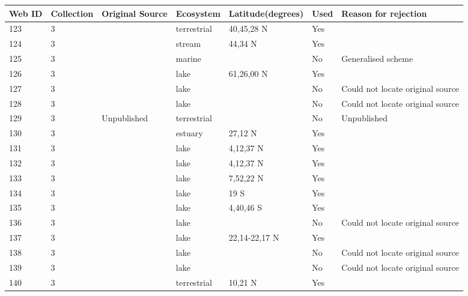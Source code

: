 \documentclass[12pt]{article}
\begin{document}
\begin{landscape}
    \begin{table}[h!]
    \centering
    {\footnotesize
      \begin{tabular}{p{2.8cm}p{1.3cm}p{3cm}p{2.2cm}p{2.5cm}lp{8.2cm}}
        \hline
        Web ID & Collection & Original Source & Ecosystem & Latitude(degrees) & Used  & Reason for rejection  \\
        \hline
        123   & 3 & \cite{Harris1972}  & terrestrial & 40,45,28 N & Yes   &       \\
        124   & 3 & \cite{Collins1976}  & stream & 44,34 N & Yes   &       \\
        125   & 3 & \cite{Landry1977}  & marine &       & No    & Generalised scheme \\
        126   & 3 & \cite{Larsson1978}  & lake  & 61,26,00 N & Yes   &       \\
        127   & 3 & \cite{Beaver1979}  & lake  &       & No    & Could not locate original source \\
        128   & 3 & \cite{Beaver1979}  & lake  &       & No    & Could not locate original source \\
        129   & 3 & Unpublished & terrestrial &       & No    & Unpublished \\
        130   & 3 & \cite{Odum1975}  & estuary & 27,12 N & Yes   &       \\
        131   & 3 & \cite{Beaver1985}  & lake  & 4,12,37 N & Yes   &       \\
        132   & 3 & \cite{Beaver1985}  & lake  & 4,12,37 N & Yes   &       \\
        133   & 3 & \cite{Beaver1985}  & lake  & 7,52,22 N & Yes   &       \\
        134   & 3 & \cite{Beaver1985}  & lake  & 19 S  & Yes   &       \\
        135   & 3 & \cite{Beaver1985}  & lake  & 4,40,46 S & Yes   &       \\
        136   & 3 & \cite{Bradshaw1983}    & lake  &       & No    & Could not locate original source \\
        137   & 3 & \cite{Corker1984}  & lake  & 22,14-22,17 N & Yes   &       \\
        138   & 3 & \cite{Kitching1983}     & lake  &       & No    & Could not locate original source \\
        139   & 3 & \cite{Kitching1983}  & lake  &       & No    & Could not locate original source \\
        140   & 3 & \cite{Seifert1979}  & terrestrial & 10,21 N & Yes   &       \\

\end{tabular}}
\end{table}
\end{landscape}
\end{document}
